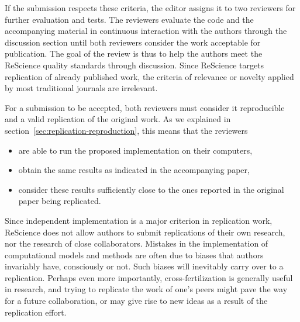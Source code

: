 \documentclass[a4paper,10pt, twocolumn]{article}
\begin{document}
If the submission respects these criteria, the editor assigns it to
two reviewers for further evaluation and tests. The reviewers evaluate
the code and the accompanying material in continuous interaction with
the authors through the discussion section until both reviewers
consider the work acceptable for publication. The goal of the review
is thus to help the authors meet the ReScience quality standards
through discussion. Since ReScience targets replication of already
published work, the criteria of relevance or novelty applied by most
traditional journals are irrelevant.

For a submission to be accepted, both reviewers must consider it
reproducible and a valid replication of the original work. As we
explained in section~\ref{sec:replication-reproduction}, this means
that the reviewers
\begin{itemize}
\item are able to run the proposed implementation on their computers,
\item obtain the same results as indicated in the accompanying paper,
\item consider these results sufficiently close to the ones reported in the original paper being replicated.
\end{itemize}
%

Since independent implementation is a major criterion in replication
work, ReScience does not allow authors to submit replications of their
own research, nor the research of close collaborators. Mistakes in the
implementation of computational models and methods are often due to
biases that authors invariably have, consciously or not. Such biases
will inevitably carry over to a replication. Perhaps even more
importantly, cross-fertilization is generally useful in research, and
trying to replicate the work of one’s peers might pave the way for a
future collaboration, or may give rise to new ideas as a result of the
replication effort.



\end{document}
